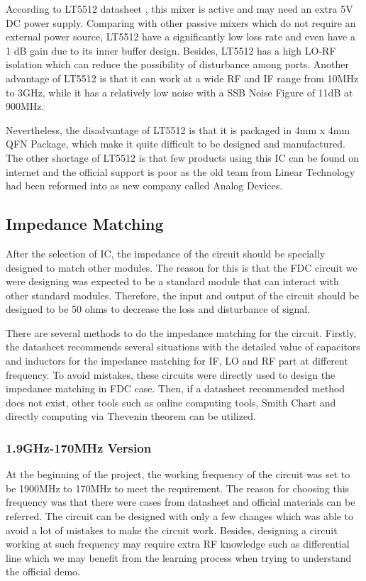 \documentclass[12pt, a4paper]{report}
\begin{document}
According to LT5512 datasheet \cite{ref:LT5512}, this mixer is active and may need an extra 5V DC power supply. Comparing with other passive mixers which do not require an external power source, LT5512 have a significantly low loss rate and even have a 1 dB gain due to its inner buffer design. Besides, LT5512 has a high LO-RF isolation which can reduce the possibility of disturbance among ports. Another advantage of LT5512 is that it can work at a wide RF and IF range from 10MHz to 3GHz, while it has a relatively low noise with a SSB Noise Figure of 11dB at 900MHz.

Nevertheless, the disadvantage of LT5512 is that it is packaged in 4mm x 4mm QFN Package, which make it quite difficult to be designed and manufactured. The other shortage of LT5512 is that few products using this IC can be found on internet and the official support is poor as the old team from Linear Technology had been reformed into as new company called Analog Devices.

\subsection{Impedance Matching}

After the selection of IC, the impedance of the circuit should be specially designed to match other modules. The reason for this is that the FDC circuit we were designing was expected to be a standard module that can interact with other standard modules. Therefore, the input and output of the circuit should be designed to be 50 ohms to decrease the loss and disturbance of signal.

There are several methods to do the impedance matching for the circuit. Firstly, the datasheet recommends several situations with the detailed value of capacitors and inductors for the impedance matching for IF, LO and RF part at different frequency. To avoid mistakes, these circuits were directly used to design the impedance matching in FDC case. Then, if a datasheet recommended method does not exist, other tools such as online computing tools, Smith Chart and directly computing via Thevenin theorem can be utilized.

\subsubsection{1.9GHz-170MHz Version}

At the beginning of the project, the working frequency of the circuit was set to be 1900MHz to 170MHz to meet the requirement. The reason for choosing this frequency was that there were cases from datasheet and official materials can be referred. The circuit can be designed with only a few changes which was able to avoid a lot of mistakes to make the circuit work. Besides, designing a circuit working at such frequency may require extra RF knowledge such as differential line which we may benefit from the learning process when trying to understand the official demo.
\end{document}

